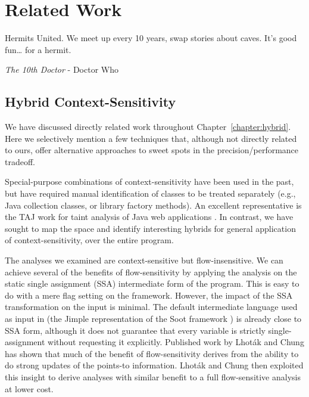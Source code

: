 \chapter{Related Work}
\label{chapter:related}
\epigraph{Hermits United. We meet up every 10 years, swap stories about caves. It’s good fun… for a hermit.}{\textit{The 10th Doctor} - Doctor Who}


\section{Hybrid Context-Sensitivity}

We have discussed directly related work throughout Chapter~\ref{chapter:hybrid}. Here we selectively mention a few techniques that, although not directly related to ours, offer alternative approaches to sweet spots in the precision/performance tradeoff.

Special-purpose combinations of context-sensitivity have been used in the past, but have required manual identification of classes to be treated separately (e.g., Java collection classes, or library factory methods). An excellent representative is the TAJ work for taint analysis of Java web applications \cite{pldi:2009:Tripp}. In contrast, we have sought to map the space and identify interesting hybrids for general application of context-sensitivity, over the entire program.

The analyses we examined are context-sensitive but flow-insensitive. We can achieve several of the benefits of flow-sensitivity by applying the analysis on the static single assignment (SSA) intermediate form of the program. This is easy to do with a mere flag setting on the \doop{} framework. However, the impact of the SSA transformation on the input is minimal. The default intermediate language used as input in \doop{} (the Jimple representation of the Soot framework \cite{cascon:1999:Vall,cc:2000:Vall}) is already close to SSA form, although it does not guarantee that every variable is strictly single-assignment without requesting it explicitly. Published work by Lhot\'{a}k and Chung \cite{popl:2011:Lhotak} has shown that much of the benefit of flow-sensitivity derives from the ability to do strong updates of the points-to information. Lhot\'{a}k and Chung then exploited this insight to derive analyses with similar benefit to a full flow-sensitive analysis at lower cost.

